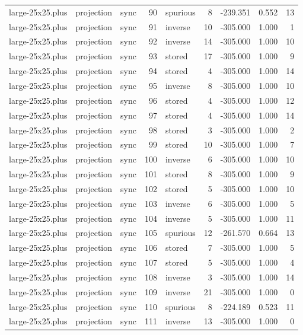 \begin{tabular}{lllrlrrrr}
large-25x25.plus & projection & sync & 90 & spurious & 8 & -239.351 & 0.552 & 13 \\
large-25x25.plus & projection & sync & 91 & inverse & 10 & -305.000 & 1.000 & 1 \\
large-25x25.plus & projection & sync & 92 & inverse & 14 & -305.000 & 1.000 & 10 \\
large-25x25.plus & projection & sync & 93 & stored & 17 & -305.000 & 1.000 & 9 \\
large-25x25.plus & projection & sync & 94 & stored & 4 & -305.000 & 1.000 & 14 \\
large-25x25.plus & projection & sync & 95 & inverse & 8 & -305.000 & 1.000 & 10 \\
large-25x25.plus & projection & sync & 96 & stored & 4 & -305.000 & 1.000 & 12 \\
large-25x25.plus & projection & sync & 97 & stored & 4 & -305.000 & 1.000 & 14 \\
large-25x25.plus & projection & sync & 98 & stored & 3 & -305.000 & 1.000 & 2 \\
large-25x25.plus & projection & sync & 99 & stored & 10 & -305.000 & 1.000 & 7 \\
large-25x25.plus & projection & sync & 100 & inverse & 6 & -305.000 & 1.000 & 10 \\
large-25x25.plus & projection & sync & 101 & stored & 8 & -305.000 & 1.000 & 9 \\
large-25x25.plus & projection & sync & 102 & stored & 5 & -305.000 & 1.000 & 10 \\
large-25x25.plus & projection & sync & 103 & inverse & 6 & -305.000 & 1.000 & 5 \\
large-25x25.plus & projection & sync & 104 & inverse & 5 & -305.000 & 1.000 & 11 \\
large-25x25.plus & projection & sync & 105 & spurious & 12 & -261.570 & 0.664 & 13 \\
large-25x25.plus & projection & sync & 106 & stored & 7 & -305.000 & 1.000 & 5 \\
large-25x25.plus & projection & sync & 107 & stored & 5 & -305.000 & 1.000 & 4 \\
large-25x25.plus & projection & sync & 108 & inverse & 3 & -305.000 & 1.000 & 14 \\
large-25x25.plus & projection & sync & 109 & inverse & 21 & -305.000 & 1.000 & 0 \\
large-25x25.plus & projection & sync & 110 & spurious & 8 & -224.189 & 0.523 & 11 \\
large-25x25.plus & projection & sync & 111 & inverse & 13 & -305.000 & 1.000 & 0 \\

\end{tabular}

